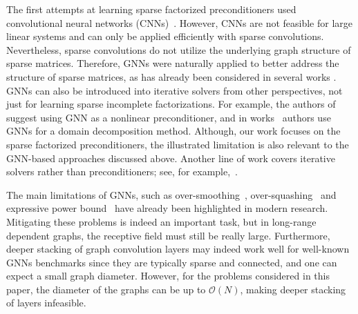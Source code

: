 \documentclass[10pt]{article} %
\theoremstyle{plain}
\theoremstyle{definition}
\theoremstyle{remark}
\begin{document}
The first attempts at learning sparse factorized preconditioners used convolutional neural networks (CNNs)~\citep{sappl2019deep,ackmann2020machine,cali2023neural}. However, CNNs are not feasible for large linear systems and can only be applied efficiently with sparse convolutions. Nevertheless, sparse convolutions do not utilize the underlying graph structure of sparse matrices. Therefore, GNNs were naturally applied to better address the structure of sparse matrices, as has already been considered in several works \citep{li2023learning,trifonov2024learning,hausner2023neural,li2024generative,booth2024neural}. GNNs can also be introduced into iterative solvers from other perspectives, not just for learning sparse incomplete factorizations. For example, the authors of~\citet{chen2024graph} suggest using GNN as a nonlinear preconditioner, and in works~\citet{taghibakhshi2022learning,taghibakhshi2023mg} authors use GNNs for a domain decomposition method. Although, our work focuses on the sparse factorized preconditioners, the illustrated limitation is also relevant to the GNN-based approaches discussed above. Another line of work covers iterative solvers rather than preconditioners; see, for example,~\citet{luoneural}.

The main limitations of GNNs, such as over-smoothing~\citep{rusch2023survey}, over-squashing~\citep{topping2021understanding} and expressive power bound~\citep{xu2018powerful} have already been highlighted in modern research. Mitigating these problems is indeed an important task, but in long-range dependent graphs, the receptive field must still be really large. Furthermore, deeper stacking of graph convolution layers may indeed work well for well-known GNNs benchmarks since they are typically sparse and connected, and one can expect a small graph diameter. However, for the problems considered in this paper, the diameter of the graphs can be up to $\mathcal{O}(N)$, making deeper stacking of layers infeasible.
\end{document}

